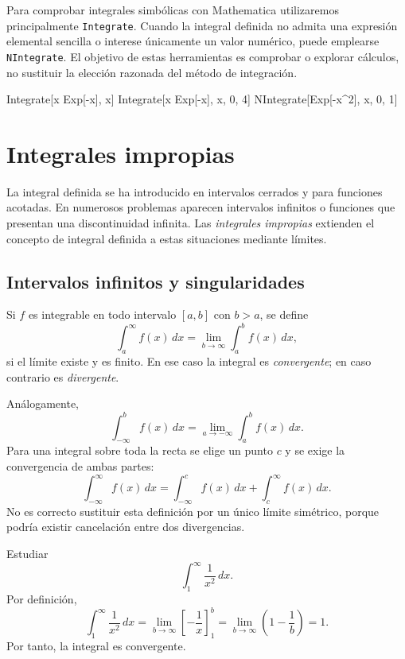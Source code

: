 Para comprobar integrales simbólicas con Mathematica utilizaremos principalmente \texttt{Integrate}. Cuando la integral definida no admita una expresión elemental sencilla o interese únicamente un valor numérico, puede emplearse \texttt{NIntegrate}. El objetivo de estas herramientas es comprobar o explorar cálculos, no sustituir la elección razonada del método de integración.

\begin{mathematicacode}
Integrate[x Exp[-x], x]
Integrate[x Exp[-x], {x, 0, 4}]
NIntegrate[Exp[-x^2], {x, 0, 1}]
\end{mathematicacode}

\section{Integrales impropias}
\label{sec:impropias}

La integral definida se ha introducido en intervalos cerrados y para funciones acotadas. En numerosos problemas aparecen intervalos infinitos o funciones que presentan una discontinuidad infinita. Las \emph{integrales impropias} extienden el concepto de integral definida a estas situaciones mediante límites.

\subsection{Intervalos infinitos y singularidades}

\begin{definition}
Si $f$ es integrable en todo intervalo $[a,b]$ con $b>a$, se define
\[
\int_a^{\infty}f(x)\,dx
=
\lim_{b\to\infty}\int_a^b f(x)\,dx,
\]
si el límite existe y es finito. En ese caso la integral es \emph{convergente}; en caso contrario es \emph{divergente}.
\end{definition}

Análogamente,
\[
\int_{-\infty}^b f(x)\,dx
=
\lim_{a\to-\infty}\int_a^b f(x)\,dx.
\]
Para una integral sobre toda la recta se elige un punto $c$ y se exige la convergencia de ambas partes:
\[
\int_{-\infty}^{\infty}f(x)\,dx
=
\int_{-\infty}^{c}f(x)\,dx+
\int_c^{\infty}f(x)\,dx.
\]
No es correcto sustituir esta definición por un único límite simétrico, porque podría existir cancelación entre dos divergencias.

\begin{example}
Estudiar
\[
\int_1^{\infty}\frac{1}{x^2}\,dx.
\]
Por definición,
\[
\int_1^{\infty}\frac{1}{x^2}\,dx
=
\lim_{b\to\infty}\left[-\frac1x\right]_1^b
=
\lim_{b\to\infty}\left(1-\frac1b\right)=1.
\]
Por tanto, la integral es convergente.
\end{example}

